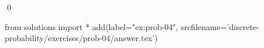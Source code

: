 
\begin{ex} 
  \label{ex:prob-04}
  
  \qed
\end{ex} 
\begin{python0}
from solutions import *
add(label="ex:prob-04",
    srcfilename='discrete-probability/exercises/prob-04/answer.tex') 
\end{python0}

